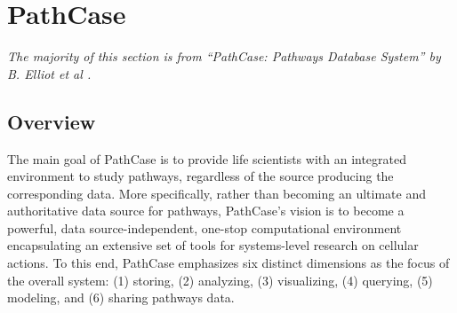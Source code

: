 \section{PathCase}
\label{sect:pathcase_kegg}

\emph{The majority of this section is from ``PathCase: Pathways Database System''
by B. Elliot et al \cite{pathcase-paper}.}

\subsection{Overview}
\label{sect:pathcase_overview}

The main goal of PathCase is to provide life scientists with an integrated
environment to study pathways, regardless of the source producing the
corresponding data. More specifically, rather than becoming an ultimate and
authoritative data source for pathways, PathCase’s vision is to become a
powerful, data source-independent, one-stop computational environment
encapsulating an extensive set of tools for systems-level research on cellular
actions. To this end, PathCase emphasizes six distinct dimensions as the focus
of the overall system: (1) storing, (2) analyzing, (3) visualizing, (4)
querying, (5) modeling, and (6) sharing pathways data.

